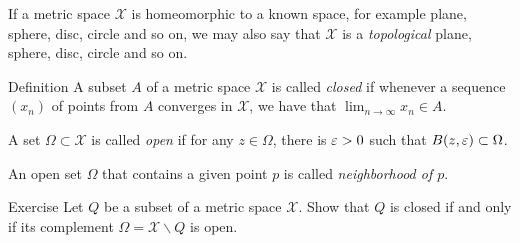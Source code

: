 If a metric space $\mathcal X$ is homeomorphic to a known space, for example plane, sphere, disc, circle and so on,
we may also say that $\mathcal X$ is a \emph{topological} plane, sphere, disc, circle and so on.

\begin{thm}{Definition}
A subset $A$ of a metric space $\mathcal{X}$ is called \emph{closed} if whenever a sequence $(x_n)$ of points from $A$ converges in $\mathcal{X}$, we have that $\lim_{n\to\infty} x_n \in A$.

A set $\Omega \subset \mathcal{X}$ is called \emph{open} if for any $z\in \Omega$, 
there is $\varepsilon>0$ such that $B(z,\varepsilon)\subset\Omega$.
\end{thm}

An open set $\Omega$ that contains a given point $p$ is called \emph{neighborhood of $p$}.

\begin{thm}{Exercise}\label{ex:close-open}
Let $Q$ be a subset of a metric space $\mathcal{X}$.
Show that $Q$ is closed if and only if its complement $\Omega=\mathcal{X}\backslash Q$ is open.
\end{thm}
